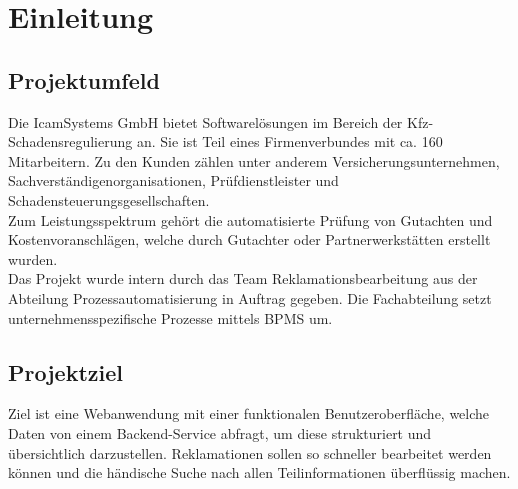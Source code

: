 \section{Einleitung}
\label{sec:Einleitung}


\subsection{Projektumfeld} 
\label{sec:Projektumfeld}
Die IcamSystems GmbH bietet Softwarelösungen im Bereich der Kfz-Schadensregulierung an.
Sie ist Teil eines Firmenverbundes mit ca. 160 Mitarbeitern. Zu den Kunden zählen unter
anderem Versicherungsunternehmen, Sachverständigenorganisationen, Prüfdienstleister und
Schadensteuerungsgesellschaften.\\
Zum Leistungsspektrum gehört die automatisierte Prüfung von Gutachten und
Kostenvoranschlägen, welche durch Gutachter oder Partnerwerkstätten erstellt wurden.\\
Das Projekt wurde intern durch das Team Reklamationsbearbeitung aus der Abteilung Prozessautomatisierung
in Auftrag gegeben. Die Fachabteilung setzt unternehmensspezifische Prozesse \ua mittels
\ac{BPMS} um.	


\subsection{Projektziel} 
\label{sec:Projektziel}
Ziel ist eine Webanwendung mit einer funktionalen Benutzeroberfläche, welche Daten von
einem Backend-Service abfragt, um diese strukturiert und übersichtlich darzustellen.
Reklamationen sollen so schneller bearbeitet werden können und die händische Suche nach
allen Teilinformationen überflüssig machen.

